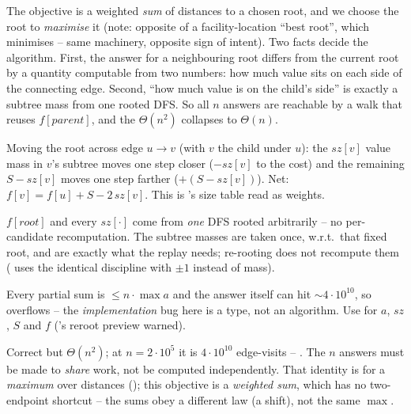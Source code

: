 The objective is a weighted \emph{sum} of distances to a chosen root, and we choose the root to
\emph{maximise} it (note: opposite of a facility-location ``best root'', which minimises -- same
machinery, opposite sign of intent). Two facts decide the algorithm. First, the answer for a
neighbouring root differs from the current root by a quantity computable from two numbers: how
much value sits on each side of the connecting edge. Second, ``how much value is on the child's
side'' is exactly a subtree mass from one rooted DFS. So all $n$ answers are reachable by a walk
that reuses $f[\mathit{parent}]$, and the $\Theta(n^2)$ collapses to $\Theta(n)$.

\begin{observation}
Moving the root across edge $u\to v$ (with $v$ the child under $u$): the $\mathit{sz}[v]$ value
mass in $v$'s subtree moves one step closer ($-\mathit{sz}[v]$ to the cost) and the remaining
$S-\mathit{sz}[v]$ moves one step farther ($+(S-\mathit{sz}[v])$). Net:
$f[v]=f[u]+S-2\,\mathit{sz}[v]$. This is 's size table read as weights.
\end{observation}
\begin{observation}
$f[\mathit{root}]$ and every $\mathit{sz}[\cdot]$ come from \emph{one} DFS rooted arbitrarily --
no per-candidate recomputation. The subtree masses are taken once, w.r.t.\ that fixed root, and
are exactly what the replay needs; re-rooting does not recompute them ( uses
the identical discipline with $\pm1$ instead of mass).
\end{observation}
\begin{observation}
Every partial sum is $\le n\cdot\max a$ and the answer itself can hit $\sim 4\cdot10^{10}$, so
 overflows -- the \emph{implementation} bug here is a type, not an algorithm. Use
 for $a$, $\mathit{sz}$, $S$ and $f$ ('s reroot preview warned).
\end{observation}

\begin{thinkbox}
{Correct but $\Theta(n^2)$; at $n=2\cdot10^{5}$ it is $4\cdot10^{10}$ edge-visits -- \tle. The $n$
answers must be made to \emph{share} work, not be computed independently.}
{That identity is for a \emph{maximum} over distances (); this objective is a
\emph{weighted sum}, which has no two-endpoint shortcut -- the sums obey a different law (a shift),
not the same $\max$.}
\end{thinkbox}

